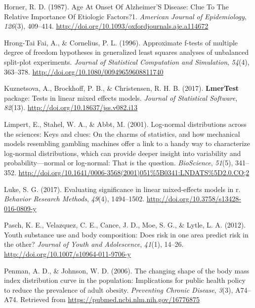 \documentclass[12pt, twoside]{amherstthesis}
\begin{document}
\leavevmode\hypertarget{ref-horner_age_1987}{}%
Horner, R. D. (1987). Age At Onset Of Alzheimer'S Disease: Clue To The Relative Importance Of Etiologic Factors?1. \emph{American Journal of Epidemiology}, \emph{126}(3), 409--414. \url{http://doi.org/10.1093/oxfordjournals.aje.a114672}

\leavevmode\hypertarget{ref-hrong-tai_fai_approximate_1996}{}%
Hrong-Tai Fai, A., \& Cornelius, P. L. (1996). Approximate f-tests of multiple degree of freedom hypotheses in generalized least squares analyses of unbalanced split-plot experiments. \emph{Journal of Statistical Computation and Simulation}, \emph{54}(4), 363--378. \url{http://doi.org/10.1080/00949659608811740}

\leavevmode\hypertarget{ref-kuznetsova_lmertest_2017}{}%
Kuznetsova, A., Brockhoff, P. B., \& Christensen, R. H. B. (2017). \textbf{LmerTest} package: Tests in linear mixed effects models. \emph{Journal of Statistical Software}, \emph{82}(13). \url{http://doi.org/10.18637/jss.v082.i13}

\leavevmode\hypertarget{ref-limpert_log-normal_2001}{}%
Limpert, E., Stahel, W. A., \& Abbt, M. (2001). Log-normal distributions across the sciences: Keys and clues: On the charms of statistics, and how mechanical models resembling gambling machines offer a link to a handy way to characterize log-normal distributions, which can provide deeper insight into variability and probability---normal or log-normal: That is the question. \emph{BioScience}, \emph{51}(5), 341--352. \url{http://doi.org/10.1641/0006-3568(2001)051\%5B0341:LNDATS\%5D2.0.CO;2}

\leavevmode\hypertarget{ref-luke_evaluating_2017}{}%
Luke, S. G. (2017). Evaluating significance in linear mixed-effects models in r. \emph{Behavior Research Methods}, \emph{49}(4), 1494--1502. \url{http://doi.org/10.3758/s13428-016-0809-y}

\leavevmode\hypertarget{ref-pasch_youth_2012}{}%
Pasch, K. E., Velazquez, C. E., Cance, J. D., Moe, S. G., \& Lytle, L. A. (2012). Youth substance use and body composition: Does risk in one area predict risk in the other? \emph{Journal of Youth and Adolescence}, \emph{41}(1), 14--26. \url{http://doi.org/10.1007/s10964-011-9706-y}

\leavevmode\hypertarget{ref-penman_changing_2006}{}%
Penman, A. D., \& Johnson, W. D. (2006). The changing shape of the body mass index distribution curve in the population: Implications for public health policy to reduce the prevalence of adult obesity. \emph{Preventing Chronic Disease}, \emph{3}(3), A74--A74. Retrieved from \url{https://pubmed.ncbi.nlm.nih.gov/16776875}
\end{document}
